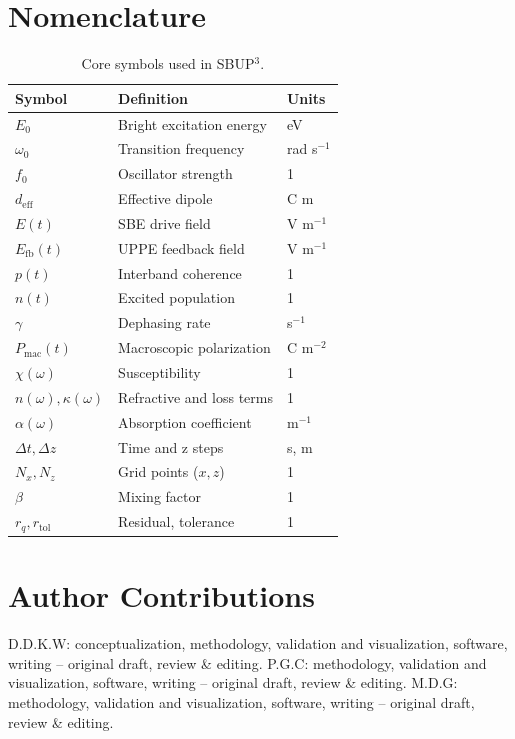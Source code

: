 \documentclass[aps,pra,twocolumn,reprint,superscriptaddress,nofootinbib]{revtex4-2}
\begin{document}
\section*{Nomenclature}
\begin{table}[!h]
\centering
\caption{Core symbols used in SBUP$^3$.}
\label{tab:nomenclature}
\small
\setlength{\tabcolsep}{2pt}
\begin{tabular*}{\columnwidth}{@{\extracolsep{\fill}}lll}
\toprule
Symbol & Definition & Units \\
\midrule
$E_0$ & Bright excitation energy & eV \\
$\omega_0$ & Transition frequency & rad s$^{-1}$ \\
$f_0$ & Oscillator strength & 1 \\
$d_{\mathrm{eff}}$ & Effective dipole & C m \\
$E(t)$ & SBE drive field & V m$^{-1}$ \\
$E_{\mathrm{fb}}(t)$ & UPPE feedback field & V m$^{-1}$ \\
$p(t)$ & Interband coherence & 1 \\
$n(t)$ & Excited population & 1 \\
$\gamma$ & Dephasing rate & s$^{-1}$ \\
$P_{\mathrm{mac}}(t)$ & Macroscopic polarization & C m$^{-2}$ \\
$\chi(\omega)$ & Susceptibility & 1 \\
$n(\omega),\kappa(\omega)$ & Refractive and loss terms & 1 \\
$\alpha(\omega)$ & Absorption coefficient & m$^{-1}$ \\
$\Delta t,\Delta z$ & Time and z steps & s, m \\
$N_x,N_z$ & Grid points ($x,z$) & 1 \\
$\beta$ & Mixing factor & 1 \\
$r_q,r_{\mathrm{tol}}$ & Residual, tolerance & 1 \\
\bottomrule
\end{tabular*}
\end{table}


\section*{Author Contributions}

D.D.K.W: conceptualization, methodology, validation and visualization, software, writing – original draft, review \& editing. P.G.C: methodology, validation and visualization, software, writing – original draft, review \& editing.  M.D.G: methodology, validation and visualization, software, writing – original draft, review \& editing.
\end{document}
